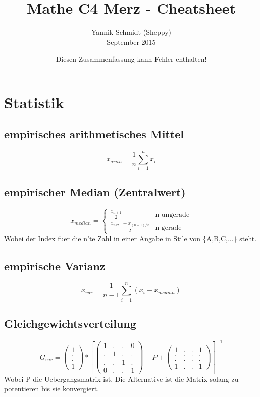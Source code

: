 \documentclass{article}
\title{Mathe C4 Merz - Cheatsheet}
\author{Yannik Schmidt (Sheppy)\\September 2015}
\date{Diesen Zusammenfassung kann Fehler enthalten!}
\begin{document}
	\maketitle
	\section{Statistik}
	\subsection{empirisches arithmetisches Mittel}
	\[x_{arith}=\frac{1}{n}\sum_{i=1}^n x_i\]
	\subsection{empirischer Median (Zentralwert)}
	\[
	x_{median}=
		\begin{cases}
			\frac{x_{n+1}}{2}								& \text{n ungerade} \\
			\frac{x_{n/2} \;\; + x_{(n+1)/2}}{2}	& \text{n gerade}
		\end{cases}
	\]
	Wobei der Index fuer die n'te Zahl in einer Angabe in Stile von \{A,B,C,...\} steht.
	\subsection{empirische Varianz}
	\[x_{var}=\frac{1}{n-1}\sum_{i=1}^n (x_i-x_{median})\]
	\subsection{Gleichgewichtsverteilung}
	\[
	G_{var} = 
		\begin{pmatrix}
		1 \\
		. \\
		. \\
		1
		\end{pmatrix}
		*\left [
		\begin{pmatrix}
		1&.&.& 0 \\
		. & 1 &.& . \\
		. & . &1& . \\
		0&.&.&1
			
		\end{pmatrix}-P+
		\begin{pmatrix}
		1&.&.&1 \\
		.&.&.&. \\
		.&.&.&. \\
		1&.&.&1
		\end{pmatrix}\right ]
		^{-1}
	\]
	Wobei P die Uebergangsmatrix ist. Die Alternative ist die Matrix solang zu potentieren bis sie konvergiert.
\end{document}
